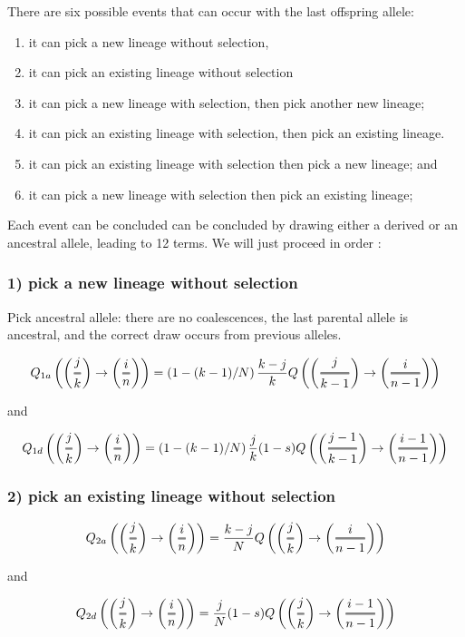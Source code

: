 \documentclass[]{article}
\newcommand{\Dfrac}[2]{%
  \left(
  \ooalign{%
    $\genfrac{}{}{1.2pt}0{#1}{#2}$\cr%
    $\color{white}\genfrac{}{}{.4pt}0{\phantom{#1}}{\phantom{#2}}$}%
  \right)
}
\begin{document}
There are six possible events that can occur with the last offspring allele: 

\begin{enumerate}
\item it can pick a new lineage without selection, 
\item it can pick an existing lineage without selection
\item it can pick a new lineage with selection, then pick another new lineage;
\item it can pick an existing lineage with selection, then pick an existing lineage. 
\item it can pick an existing lineage with selection then pick a new lineage; and 
\item it can pick a new lineage with selection then pick an existing lineage; 

\end{enumerate}
Each event can be concluded can be concluded by drawing either a derived or an ancestral allele, leading to 12 terms. We will just proceed in order :

\subsubsection{1) pick a new lineage without selection}
Pick ancestral allele: there are no coalescences, the last parental allele is ancestral, and the correct draw occurs from previous alleles. 

$$Q_{1a}\left(\Dfrac{j}{k} \rightarrow \Dfrac{i}{n} \right) = \left(1-(k-1)/N\right)\frac{k-j}{k} Q\left(\Dfrac{j}{k-1} \rightarrow \Dfrac{i}{n-1} \right) $$
 
 and 
 
$$Q_{1d}\left(\Dfrac{j}{k} \rightarrow \Dfrac{i}{n} \right) = \left(1-(k-1)/N\right)\frac{j}{k} (1-s) Q\left(\Dfrac{j-1}{k-1} \rightarrow \Dfrac{i-1}{n-1} \right) $$

\subsubsection{2) pick an existing lineage without selection}


$$Q_{2a}\left(\Dfrac{j}{k} \rightarrow \Dfrac{i}{n} \right) = \frac{k-j}{N} Q\left(\Dfrac{j}{k} \rightarrow \Dfrac{i}{n-1} \right) $$
 
 and 
 
$$Q_{2d}\left(\Dfrac{j}{k} \rightarrow \Dfrac{i}{n} \right) =  \frac{j}{N} (1-s) Q\left(\Dfrac{j}{k} \rightarrow \Dfrac{i-1}{n-1} \right) $$
\end{document}
